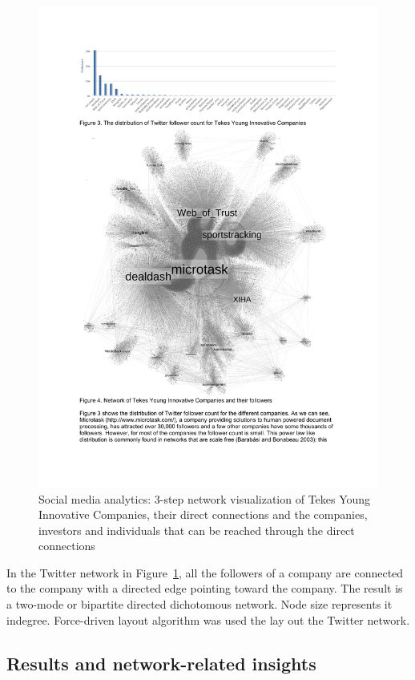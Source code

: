 \begin{figure}[htb]
\centering
\includegraphics[width=12cm]{figure/Tekes-YIC-Twitter.pdf}
\caption{Social media analytics: 3-step network visualization of Tekes Young Innovative Companies, their direct connections and the companies, investors and individuals that can be reached through the direct connections
 \citep{Huhtamaki2012NetworksFinland}}
\label{fig:tekes-yic-twitter}
\end{figure}

In the Twitter network in Figure~\ref{fig:tekes-yic-twitter}, all the followers of a company are connected to the company with a directed edge pointing toward the company. The result is a two-mode or bipartite directed dichotomous network. Node size represents it indegree. Force-driven layout algorithm was used the lay out the Twitter network.

\subsection{Results and network-related insights}

